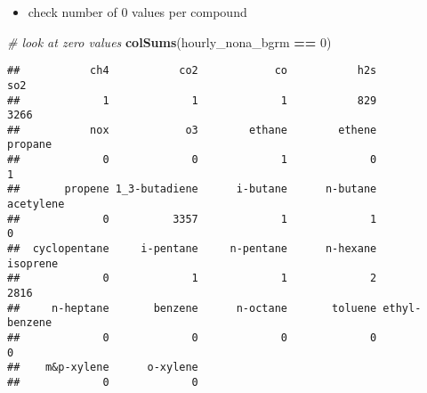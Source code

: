 \documentclass[
]{article}
\newenvironment{Shaded}{\begin{snugshade}}{\end{snugshade}}
\newcommand{\CommentTok}[1]{\textcolor[rgb]{0.56,0.35,0.01}{\textit{#1}}}
\newcommand{\DecValTok}[1]{\textcolor[rgb]{0.00,0.00,0.81}{#1}}
\newcommand{\FunctionTok}[1]{\textcolor[rgb]{0.13,0.29,0.53}{\textbf{#1}}}
\newcommand{\NormalTok}[1]{#1}
\newcommand{\OtherTok}[1]{\textcolor[rgb]{0.56,0.35,0.01}{#1}}
\newcommand{\SpecialCharTok}[1]{\textcolor[rgb]{0.81,0.36,0.00}{\textbf{#1}}}
\providecommand{\tightlist}{%
  \setlength{\itemsep}{0pt}\setlength{\parskip}{0pt}}
\begin{document}
\begin{Shaded}
\end{Shaded}

\begin{itemize}
\tightlist
\item
  check number of 0 values per compound
\end{itemize}

\begin{Shaded}
\begin{Highlighting}[]
\CommentTok{\# look at zero values}
\FunctionTok{colSums}\NormalTok{(hourly\_nona\_bgrm }\SpecialCharTok{==} \DecValTok{0}\NormalTok{)}
\end{Highlighting}
\end{Shaded}

\begin{verbatim}
##           ch4           co2            co           h2s           so2 
##             1             1             1           829          3266 
##           nox            o3        ethane        ethene       propane 
##             0             0             1             0             1 
##       propene 1_3-butadiene      i-butane      n-butane     acetylene 
##             0          3357             1             1             0 
##  cyclopentane     i-pentane     n-pentane      n-hexane      isoprene 
##             0             1             1             2          2816 
##     n-heptane       benzene      n-octane       toluene ethyl-benzene 
##             0             0             0             0             0 
##    m&p-xylene      o-xylene 
##             0             0
\end{verbatim}
\end{document}
